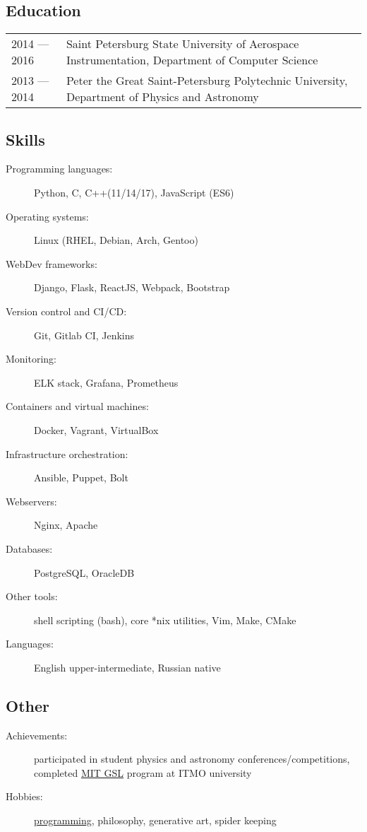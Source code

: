 \documentclass[12pt]{report}
\begin{document}
\subsection*{Education}
\begin{table}[H]
    \begin{tabular}{@{}p{}p{}}
        2014 --- 2016 & Saint Petersburg State University of Aerospace Instrumentation, Department of Computer Science \\
        2013 --- 2014 & Peter the Great Saint-Petersburg Polytechnic University, Department of Physics and Astronomy
    \end{tabular}
\end{table}

\subsection*{Skills}
\begin{description}
    \item[Programming languages:]
    Python, C, C++(11/14/17), JavaScript (ES6)
    \item[Operating systems:]
    Linux (RHEL, Debian, Arch, Gentoo)
    \item[WebDev frameworks:]
    Django, Flask, ReactJS, Webpack, Bootstrap
    \item[Version control and CI/CD:]
    Git, Gitlab CI, Jenkins
    \item[Monitoring:]
    ELK stack, Grafana, Prometheus
    \item[Containers and virtual machines:]
    Docker, Vagrant, VirtualBox
    \item[Infrastructure orchestration:]
    Ansible, Puppet, Bolt
    \item[Webservers:]
    Nginx, Apache
    \item[Databases:]
    PostgreSQL, OracleDB
    \item[Other tools:]
    shell scripting (bash), core *nix utilities, Vim, Make, CMake
    \item[Languages:]
    English upper-intermediate, Russian native
\end{description}

\subsection*{Other}
\begin{description}
    \item[Achievements:]
        participated in student physics and astronomy conferences/competitions,
        completed \href{https://gsl.mit.edu/}{MIT GSL} program at ITMO university
    \item[Hobbies:]
    \href{https://github.com/unsip}{programming}, philosophy, generative art, spider keeping
\end{description}
\end{document}
